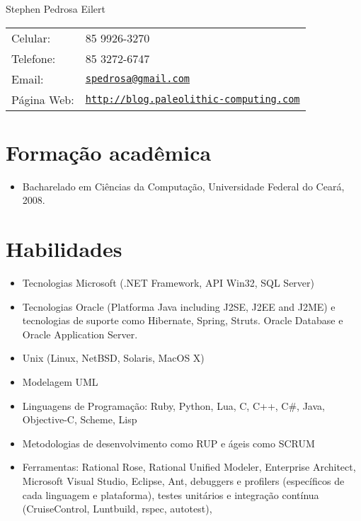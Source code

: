 \documentclass[letterpaper]{article}
\def\name{Stephen Pedrosa Eilert}
\begin{document}
\begin{flushright}

{\huge \name}


\vspace{0.25in}
\begin{minipage}{0.45\linewidth}
  \begin{tabular}{ll}
    Celular: & 85 9926-3270 \\
    Telefone: & 85 3272-6747 \\
    Email: & \href{mailto:spedrosa@gmail.com}{\tt spedrosa@gmail.com} \\
    Página Web: & \href{http://blog.paleolithic-computing.com}{\tt http://blog.paleolithic-computing.com} \\
  \end{tabular}
\end{minipage}
\end{flushright}

\section*{Formação acadêmica}

\begin{itemize}
  \item Bacharelado em Ciências da Computação, Universidade Federal do Ceará, 2008.
\end{itemize}

\section*{Habilidades}
\begin{itemize}
  \item Tecnologias Microsoft (.NET Framework, API Win32, SQL Server)
  \item Tecnologias Oracle (Platforma Java including J2SE, J2EE and J2ME) e tecnologias
    de suporte como Hibernate, Spring, Struts.
    Oracle Database e Oracle Application Server.
  \item Unix (Linux, NetBSD, Solaris, MacOS X)
  \item Modelagem UML
  \item Linguagens de Programação: Ruby, Python, Lua, C, C++, C\#, Java, Objective-C, Scheme, Lisp
  \item Metodologias de desenvolvimento como RUP e ágeis como SCRUM
  \item Ferramentas: Rational Rose, Rational Unified Modeler, Enterprise Architect, Microsoft
Visual Studio, Eclipse, Ant, debuggers e profilers (específicos de cada linguagem e plataforma),
testes unitários e integração contínua (CruiseControl, Luntbuild, rspec, autotest),
\end{itemize}
\end{document}
